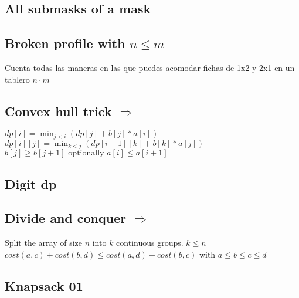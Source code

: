
\subsection{All submasks of a mask }


\subsection{Broken profile  with $n \leq m$}

Cuenta todas las maneras en las que puedes acomodar fichas de 1x2 y 2x1 en un tablero $n \cdot m$ \\

\subsection{Convex hull trick  $\Rightarrow$ }

$ dp[i] = \min_{j < i}(dp[j] + b[j] * a[i]) $ \\
$ dp[i][j] = \min_{k < j}(dp[i - 1][k] + b[k] * a[j]) $ \\
$ b[j] \geq b[j + 1] \text{ optionally } a[i] \leq a[i + 1] $ \\ 

\subsection{Digit dp }


\subsection{Divide and conquer  $\Rightarrow$ }

Split the array of size $n$ into $k$ continuous groups. $k \leq n$ \\
$ cost(a, c) + cost(b, d) \leq cost(a, d) + cost(b, c)$ with $a \leq b \leq c \leq d$ \\

\subsection{Knapsack 01 }

